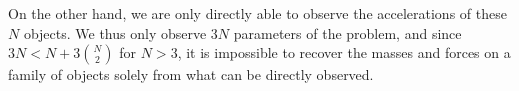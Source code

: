 
%
%


%
%
%
%


On the other hand, we are only directly able to observe the accelerations of these $N$ objects. We thus only observe $3N$ parameters of the problem, and since $3N < N + 3 \binom{N}{2}$ for $N > 3$, it is impossible to recover the masses and forces on a family of objects solely from what can be directly observed.



